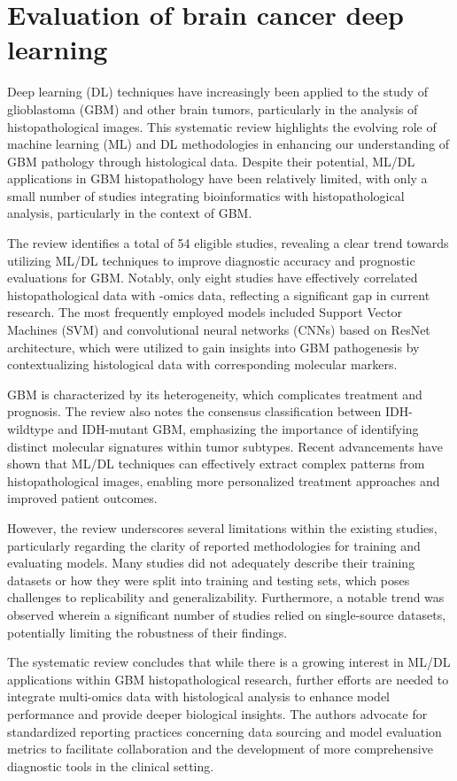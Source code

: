 \documentclass[runningheads]{llncs}
\begin{document}
\section{Evaluation of brain cancer deep learning}
Deep learning (DL) techniques have increasingly been applied to the study of glioblastoma (GBM) and other brain tumors, particularly in the analysis of histopathological images. This systematic review highlights the evolving role of machine learning (ML) and DL methodologies in enhancing our understanding of GBM pathology through histological data. Despite their potential, ML/DL applications in GBM histopathology have been relatively limited, with only a small number of studies integrating bioinformatics with histopathological analysis, particularly in the context of GBM.

The review identifies a total of 54 eligible studies, revealing a clear trend towards utilizing ML/DL techniques to improve diagnostic accuracy and prognostic evaluations for GBM. Notably, only eight studies have effectively correlated histopathological data with -omics data, reflecting a significant gap in current research. The most frequently employed models included Support Vector Machines (SVM) and convolutional neural networks (CNNs) based on ResNet architecture, which were utilized to gain insights into GBM pathogenesis by contextualizing histological data with corresponding molecular markers.

GBM is characterized by its heterogeneity, which complicates treatment and prognosis. The review also notes the consensus classification between IDH-wildtype and IDH-mutant GBM, emphasizing the importance of identifying distinct molecular signatures within tumor subtypes. Recent advancements have shown that ML/DL techniques can effectively extract complex patterns from histopathological images, enabling more personalized treatment approaches and improved patient outcomes.

However, the review underscores several limitations within the existing studies, particularly regarding the clarity of reported methodologies for training and evaluating models. Many studies did not adequately describe their training datasets or how they were split into training and testing sets, which poses challenges to replicability and generalizability. Furthermore, a notable trend was observed wherein a significant number of studies relied on single-source datasets, potentially limiting the robustness of their findings.

The systematic review concludes that while there is a growing interest in ML/DL applications within GBM histopathological research, further efforts are needed to integrate multi-omics data with histological analysis to enhance model performance and provide deeper biological insights. The authors advocate for standardized reporting practices concerning data sourcing and model evaluation metrics to facilitate collaboration and the development of more comprehensive diagnostic tools in the clinical setting.
\end{document}
